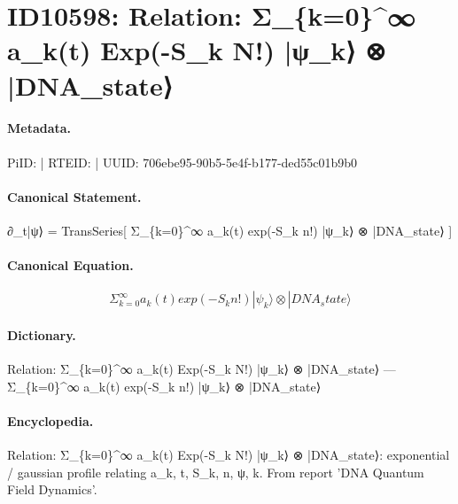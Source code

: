 \section*{ID10598: Relation: Σ\_\{k=0\}\textasciicircum{}∞ a\_k(t) Exp(-S\_k N!) |ψ\_k⟩ ⊗ |DNA\_state⟩}
\paragraph{Metadata.}
PiID:  | RTEID:  | UUID: 706ebe95-90b5-5e4f-b177-ded55c01b9b0

\paragraph{Canonical Statement.}
∂\_t|ψ⟩ = TransSeries[ Σ\_\{k=0\}\textasciicircum{}∞ a\_k(t) exp(-S\_k n!) |ψ\_k⟩ ⊗ |DNA\_state⟩ ]

\paragraph{Canonical Equation.}
\[
Σ_{k=0}^∞ a_k(t) exp(-S_k n!) |ψ_k⟩ ⊗ |DNA_state⟩
\]

\paragraph{Dictionary.}
Relation: Σ\_\{k=0\}\textasciicircum{}∞ a\_k(t) Exp(-S\_k N!) |ψ\_k⟩ ⊗ |DNA\_state⟩ — Σ\_\{k=0\}\textasciicircum{}∞ a\_k(t) exp(-S\_k n!) |ψ\_k⟩ ⊗ |DNA\_state⟩

\paragraph{Encyclopedia.}
Relation: Σ\_\{k=0\}\textasciicircum{}∞ a\_k(t) Exp(-S\_k N!) |ψ\_k⟩ ⊗ |DNA\_state⟩: exponential / gaussian profile relating a\_k, t, S\_k, n, ψ, k. From report 'DNA Quantum Field Dynamics'.
